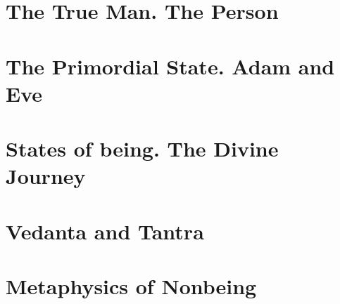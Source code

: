 \documentclass[a4paper,12pt,twoside]{book}
\begin{document}
\chapter{The True Man. The Person}












\chapter{The Primordial State. Adam and Eve}




\chapter{States of being. The Divine Journey}












\chapter{Vedanta and Tantra}








\chapter{Metaphysics of Nonbeing}




\end{document}
